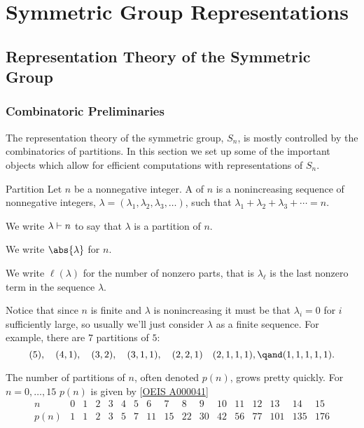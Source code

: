 \part{Symmetric Group Representations}
\chapter{Representation Theory of the Symmetric Group}
\label{chap:reps of Sn}
\section{Combinatoric Preliminaries}
The representation theory of the symmetric group, \(S_n\), is mostly controlled by the combinatorics of partitions.
In this section we set up some of the important objects which allow for efficient computations with representations of \(S_n\).

\begin{dfn}{Partition}{}
    Let \(n\) be a nonnegative integer.
    A  of \(n\) is a nonincreasing sequence of nonnegative integers, \(\lambda = (\lambda_1, \lambda_2, \lambda_3, \dotsc)\), such that \(\lambda_1 + \lambda_2 + \lambda_3 + \dotsb = n\).
\end{dfn}

\begin{ntn}{}{}
    We write \(\lambda \vdash n\) to say that \(\lambda\) is a partition of \(n\).
    
    We write \(\abs{\lambda}\) for \(n\).
    
    We write \(\ell(\lambda)\) for the number of nonzero parts, that is \(\lambda_\ell\) is the last nonzero term in the sequence \(\lambda\).
\end{ntn}

Notice that since \(n\) is finite and \(\lambda\) is nonincreasing it must be that \(\lambda_i = 0\) for \(i\) sufficiently large, so usually we'll just consider \(\lambda\) as a finite sequence.
For example, there are \(7\) partitions of \(5\):
\begin{equation*}
    (5), \quad (4, 1), \quad (3, 2), \quad (3, 1, 1), \quad (2, 2, 1) \quad (2, 1, 1, 1), \qand (1, 1, 1, 1, 1).
\end{equation*}

The number of partitions of \(n\), often denoted \(p(n)\), grows pretty quickly.
For \(n = 0, \dotsc, 15\) \(p(n)\) is given by [\hyperlink{https://oeis.org/A000041}{OEIS A000041}]
\begin{equation*}
    \begin{array}{r|rrrrrrrrrrrrrrrr}
        n & 0 & 1 & 2 & 3 & 4 & 5 & 6 & 7 & 8 & 9 & 10 & 11 & 12 & 13 & 14 & 15\\ \hline
        p(n) & 1 & 1 & 2 & 3 & 5 & 7 & 11 & 15 & 22 & 30 & 42 & 56 & 77 & 101 & 135 & 176
    \end{array}
\end{equation*}

